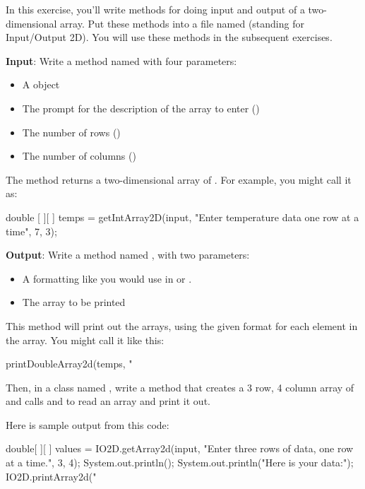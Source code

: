 \begin{exercise}
In this exercise, you'll write methods for doing input and output of a two-dimensional array. Put these methods into a file named  (standing for Input/Output 2D). You will use these methods in the subsequent exercises.

{\bf Input}: Write a  method named  with four parameters:

\begin{itemize}
\item A  object
\item The prompt for the description of the array to enter ()
\item The number of rows ()
\item The number of columns ()
\end{itemize}

The method returns a two-dimensional array of . For example, you might call it as:

\begin{code}
double [ ][ ] temps = getIntArray2D(input,
  "Enter temperature data one row at a time", 7, 3);
\end{code}

{\bf Output}: Write a  method named , with two parameters:
\begin{itemize}
\item A formatting  like you would use in  or .
\item The array to be printed
\end{itemize}

This method will print out the arrays, using the given format for each element in the array. You might call it
like this:

\begin{code}
printDoubleArray2d(temps, "%
\end{code}

Then, in a class named , write a  method that creates a 3 row, 4 column array of  and calls  and  to read an array and print it out. 

Here is sample output from this code:

\begin{code}
double[ ][ ] values = IO2D.getArray2d(input,
    "Enter three rows of data, one row at a time.", 3, 4);
System.out.println();
System.out.println("Here is your data:");
IO2D.printArray2d("%
\end{code}


\end{exercise}

